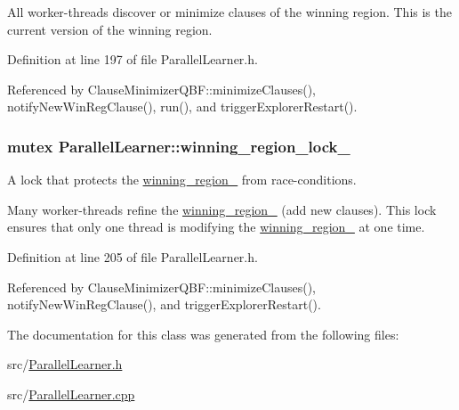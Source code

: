 All worker-\/threads discover or minimize clauses of the winning region. This is the current version of the winning region. 

Definition at line 197 of file Parallel\-Learner.\-h.



Referenced by Clause\-Minimizer\-Q\-B\-F\-::minimize\-Clauses(), notify\-New\-Win\-Reg\-Clause(), run(), and trigger\-Explorer\-Restart().

\hypertarget{classParallelLearner_a196a4500dfd66a4b9110659b4a10dead}{
\subsubsection[{winning\-\_\-region\-\_\-lock\-\_\-}]{\setlength{\rightskip}{0pt plus 5cm}mutex Parallel\-Learner\-::winning\-\_\-region\-\_\-lock\-\_\-}}\label{classParallelLearner_a196a4500dfd66a4b9110659b4a10dead}


A lock that protects the \hyperlink{classParallelLearner_a7c8383543ff98d7a0356a237756dcdd6}{winning\-\_\-region\-\_\-} from race-\/conditions. 

Many worker-\/threads refine the \hyperlink{classParallelLearner_a7c8383543ff98d7a0356a237756dcdd6}{winning\-\_\-region\-\_\-} (add new clauses). This lock ensures that only one thread is modifying the \hyperlink{classParallelLearner_a7c8383543ff98d7a0356a237756dcdd6}{winning\-\_\-region\-\_\-} at one time. 

Definition at line 205 of file Parallel\-Learner.\-h.



Referenced by Clause\-Minimizer\-Q\-B\-F\-::minimize\-Clauses(), notify\-New\-Win\-Reg\-Clause(), and trigger\-Explorer\-Restart().



The documentation for this class was generated from the following files\-:\begin{DoxyCompactItemize}
\item 
src/\hyperlink{ParallelLearner_8h}{Parallel\-Learner.\-h}\item 
src/\hyperlink{ParallelLearner_8cpp}{Parallel\-Learner.\-cpp}\end{DoxyCompactItemize}
